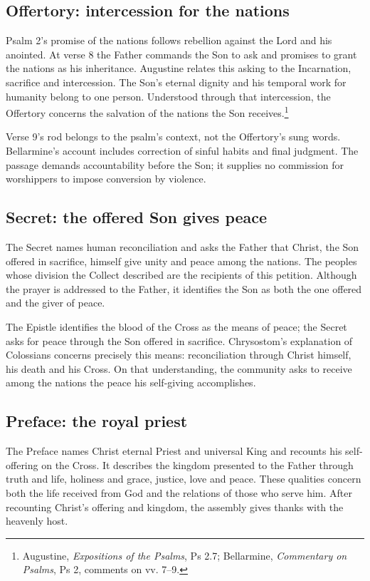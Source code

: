 \subsection{Offertory: intercession for the nations}
Psalm 2's promise of the nations follows rebellion against the Lord and his anointed. At verse 8 the Father commands the Son to ask and promises to grant the nations as his inheritance. Augustine relates this asking to the Incarnation, sacrifice and intercession. The Son's eternal dignity and his temporal work for humanity belong to one person. Understood through that intercession, the Offertory concerns the salvation of the nations the Son receives.\footnote{Augustine, \emph{Expositions of the Psalms}, Ps 2.7; Bellarmine, \emph{Commentary on Psalms}, Ps 2, comments on vv. 7--9.}

Verse 9's rod belongs to the psalm's context, not the Offertory's sung words. Bellarmine's account includes correction of sinful habits and final judgment. The passage demands accountability before the Son; it supplies no commission for worshippers to impose conversion by violence.

\subsection{Secret: the offered Son gives peace}
The Secret names human reconciliation and asks the Father that Christ, the Son offered in sacrifice, himself give unity and peace among the nations. The peoples whose division the Collect described are the recipients of this petition. Although the prayer is addressed to the Father, it identifies the Son as both the one offered and the giver of peace.

The Epistle identifies the blood of the Cross as the means of peace; the Secret asks for peace through the Son offered in sacrifice. Chrysostom's explanation of Colossians concerns precisely this means: reconciliation through Christ himself, his death and his Cross. On that understanding, the community asks to receive among the nations the peace his self-giving accomplishes.

\subsection{Preface: the royal priest}
The Preface names Christ eternal Priest and universal King and recounts his self-offering on the Cross. It describes the kingdom presented to the Father through truth and life, holiness and grace, justice, love and peace. These qualities concern both the life received from God and the relations of those who serve him. After recounting Christ's offering and kingdom, the assembly gives thanks with the heavenly host.


